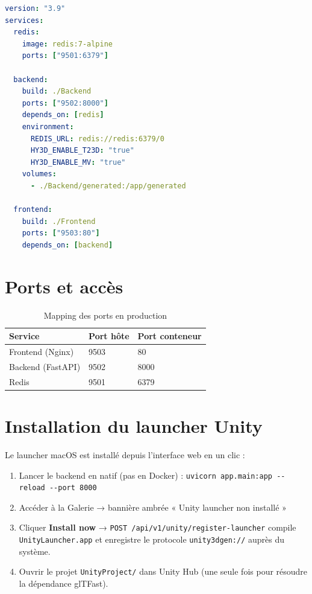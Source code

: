 \documentclass[12pt,a4paper,oneside]{report}
\begin{document}
\begin{lstlisting}[language=yaml, caption={docker-compose.yml — extrait}]
version: "3.9"
services:
  redis:
    image: redis:7-alpine
    ports: ["9501:6379"]

  backend:
    build: ./Backend
    ports: ["9502:8000"]
    depends_on: [redis]
    environment:
      REDIS_URL: redis://redis:6379/0
      HY3D_ENABLE_T23D: "true"
      HY3D_ENABLE_MV: "true"
    volumes:
      - ./Backend/generated:/app/generated

  frontend:
    build: ./Frontend
    ports: ["9503:80"]
    depends_on: [backend]
\end{lstlisting}

\section{Ports et accès}

\begin{table}[H]
\centering
\caption{Mapping des ports en production}
\label{tab:ports}
\begin{tabular}{@{}lll@{}}
\toprule
\textbf{Service} & \textbf{Port hôte} & \textbf{Port conteneur} \\\midrule
Frontend (Nginx)  & 9503 & 80 \\
Backend (FastAPI) & 9502 & 8000 \\
Redis             & 9501 & 6379 \\
\bottomrule
\end{tabular}
\end{table}

\section{Installation du launcher Unity}

Le launcher macOS est installé depuis l'interface web en un clic :

\begin{enumerate}
  \item Lancer le backend en natif (pas en Docker) :
        \lstinline|uvicorn app.main:app --reload --port 8000|
  \item Accéder à la Galerie → bannière ambrée « Unity launcher non installé »
  \item Cliquer \textbf{Install now} → \texttt{POST /api/v1/unity/register-launcher}
        compile \texttt{UnityLauncher.app} et enregistre le protocole
        \texttt{unity3dgen://} auprès du système.
  \item Ouvrir le projet \texttt{UnityProject/} dans Unity Hub (une seule fois
        pour résoudre la dépendance glTFast).
\end{enumerate}
\end{document}
